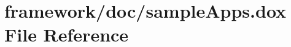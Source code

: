 \hypertarget{sample_apps_8dox}{}\section{framework/doc/sample\+Apps.dox File Reference}
\label{sample_apps_8dox}

